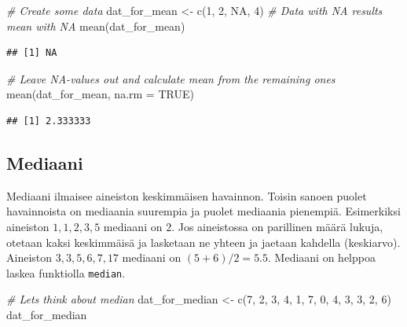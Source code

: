 \documentclass[
]{book}
\newenvironment{Shaded}{\begin{snugshade}}{\end{snugshade}}
\newcommand{\AttributeTok}[1]{\textcolor[rgb]{0.77,0.63,0.00}{#1}}
\newcommand{\CommentTok}[1]{\textcolor[rgb]{0.56,0.35,0.01}{\textit{#1}}}
\newcommand{\ConstantTok}[1]{\textcolor[rgb]{0.00,0.00,0.00}{#1}}
\newcommand{\DecValTok}[1]{\textcolor[rgb]{0.00,0.00,0.81}{#1}}
\newcommand{\FunctionTok}[1]{\textcolor[rgb]{0.00,0.00,0.00}{#1}}
\newcommand{\NormalTok}[1]{#1}
\newcommand{\OtherTok}[1]{\textcolor[rgb]{0.56,0.35,0.01}{#1}}
\begin{document}
\begin{Shaded}
\begin{Highlighting}[]
\CommentTok{\# Create some data}
\NormalTok{dat\_for\_mean }\OtherTok{\textless{}{-}} \FunctionTok{c}\NormalTok{(}\DecValTok{1}\NormalTok{, }\DecValTok{2}\NormalTok{, }\ConstantTok{NA}\NormalTok{, }\DecValTok{4}\NormalTok{)}
\CommentTok{\# Data with NA results mean with NA}
\FunctionTok{mean}\NormalTok{(dat\_for\_mean)}
\end{Highlighting}
\end{Shaded}

\begin{verbatim}
## [1] NA
\end{verbatim}

\begin{Shaded}
\begin{Highlighting}[]
\CommentTok{\# Leave NA{-}values out and calculate mean from the remaining ones}
\FunctionTok{mean}\NormalTok{(dat\_for\_mean, }\AttributeTok{na.rm =} \ConstantTok{TRUE}\NormalTok{)}
\end{Highlighting}
\end{Shaded}

\begin{verbatim}
## [1] 2.333333
\end{verbatim}

\hypertarget{mediaani}{%
\subsection{Mediaani}\label{mediaani}}

Mediaani ilmaisee aineiston keskimmäisen havainnon. Toisin sanoen puolet havainnoista on mediaania suurempia ja puolet mediaania pienempiä. Esimerkiksi aineiston \(1, 1, 2, 3, 5\) mediaani on \(2\). Jos aineistossa on parillinen määrä lukuja, otetaan kaksi keskimmäisä ja lasketaan ne yhteen ja jaetaan kahdella (keskiarvo). Aineiston \(3, 3, 5, 6, 7, 17\) mediaani on \((5 + 6) / 2 = 5.5\). Mediaani on helppoa laskea funktiolla \texttt{median}.

\begin{Shaded}
\begin{Highlighting}[]
\CommentTok{\# Let\textquotesingle{}s think about median}
\NormalTok{dat\_for\_median }\OtherTok{\textless{}{-}} \FunctionTok{c}\NormalTok{(}\DecValTok{7}\NormalTok{, }\DecValTok{2}\NormalTok{, }\DecValTok{3}\NormalTok{, }\DecValTok{4}\NormalTok{, }\DecValTok{1}\NormalTok{, }\DecValTok{7}\NormalTok{, }\DecValTok{0}\NormalTok{, }\DecValTok{4}\NormalTok{, }\DecValTok{3}\NormalTok{, }\DecValTok{3}\NormalTok{, }\DecValTok{2}\NormalTok{, }\DecValTok{6}\NormalTok{)}
\NormalTok{dat\_for\_median}
\end{Highlighting}
\end{Shaded}
\end{document}
